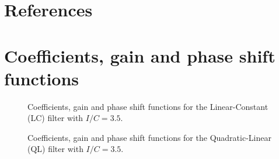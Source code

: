 \documentclass[
]{article}
\newcommand\1{\mathds{1}}
\begin{document}
\newpage

\section*{References}\label{references}

\printbibliography[heading=none]

\appendix
\newpage

\section{Coefficients, gain and phase shift functions}\label{sec-an-cof}

\begin{figure}[H]

\caption{\label{fig-graphs-coef-lc}Coefficients, gain and phase shift
functions for the Linear-Constant (LC) filter with \(I/C=3.5\).}


\end{figure}%

\begin{figure}[H]

\caption{\label{fig-graphs-coef-ql}Coefficients, gain and phase shift
functions for the Quadratic-Linear (QL) filter with \(I/C=3.5\).}


\end{figure}%
\end{document}
